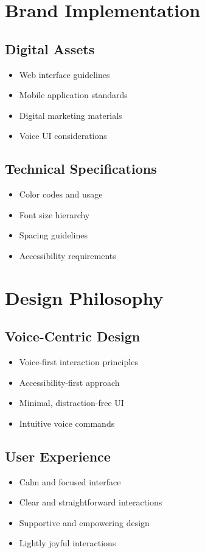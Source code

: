 \section{Brand Implementation}
\subsection{Digital Assets}
\begin{itemize}
    \item Web interface guidelines
    \item Mobile application standards
    \item Digital marketing materials
    \item Voice UI considerations
\end{itemize}

\subsection{Technical Specifications}
\begin{itemize}
    \item Color codes and usage
    \item Font size hierarchy
    \item Spacing guidelines
    \item Accessibility requirements
\end{itemize}

\section{Design Philosophy}
\subsection{Voice-Centric Design}
\begin{itemize}
    \item Voice-first interaction principles
    \item Accessibility-first approach
    \item Minimal, distraction-free UI
    \item Intuitive voice commands
\end{itemize}

\subsection{User Experience}
\begin{itemize}
    \item Calm and focused interface
    \item Clear and straightforward interactions
    \item Supportive and empowering design
    \item Lightly joyful interactions
\end{itemize}

